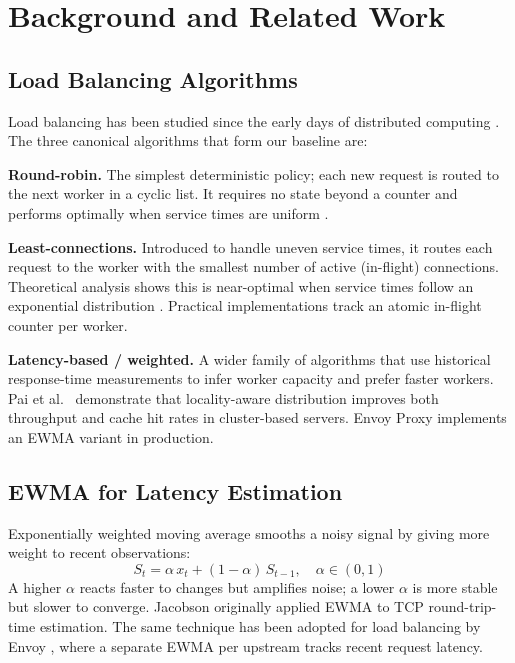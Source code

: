 \documentclass[conference]{IEEEtran}
\begin{document}
\section{Background and Related Work}

\subsection{Load Balancing Algorithms}

Load balancing has been studied since the early days of distributed
computing \cite{tanenbaum}. The three canonical algorithms that form our
baseline are:

\textbf{Round-robin.} The simplest deterministic policy; each new request
is routed to the next worker in a cyclic list. It requires no state beyond
a counter and performs optimally when service times are uniform \cite{cardellini}.

\textbf{Least-connections.} Introduced to handle uneven service times,
it routes each request to the worker with the smallest number of active
(in-flight) connections. Theoretical analysis shows this is near-optimal
when service times follow an exponential distribution \cite{mitzenmacher2001}.
Practical implementations track an atomic in-flight counter per worker.

\textbf{Latency-based / weighted.} A wider family of algorithms that
use historical response-time measurements to infer worker capacity and
prefer faster workers. Pai et al.\ \cite{pai1998} demonstrate that
locality-aware distribution improves both throughput and cache hit rates
in cluster-based servers. Envoy Proxy \cite{envoy} implements an EWMA
variant in production.

\subsection{EWMA for Latency Estimation}

Exponentially weighted moving average smooths a noisy signal by giving
more weight to recent observations:
\begin{equation}
    S_t = \alpha \, x_t + (1-\alpha) \, S_{t-1}, \quad \alpha \in (0,1)
\end{equation}
A higher $\alpha$ reacts faster to changes but amplifies noise; a lower
$\alpha$ is more stable but slower to converge. Jacobson \cite{jacobson1988}
originally applied EWMA to TCP round-trip-time estimation. The same
technique has been adopted for load balancing by Envoy \cite{envoy},
where a separate EWMA per upstream tracks recent request latency.
\end{document}
